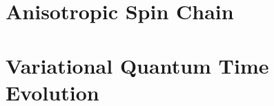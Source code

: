 \documentclass[twoside]{report}
\begin{document}
  \chapter{Anisotropic Spin Chain}
  \label{chap:main}
  
  \chapter{Variational Quantum Time Evolution}
  \label{chap:vqte}
  
  \printbibliography
\end{document}
